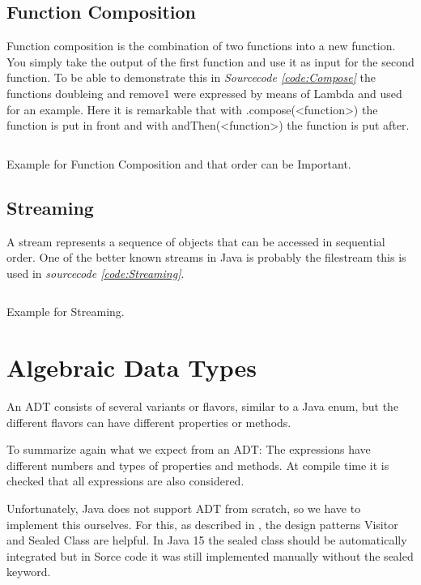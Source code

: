 \documentclass[a4paper,12pt,twoside]{scrreprt}
\begin{document}
\subsection{Function Composition}
Function composition is the combination of two functions into a new function. You simply take the output of the first function and use it as input for the second function. To be able to demonstrate this in \emph{Sourcecode \ref{code:Compose}} the functions doubleing and remove1 were expressed by means of Lambda and used for an example. Here it is remarkable that with .compose(<function>) the function is put in front and with andThen(<function>) the function is put after.
\begin{listing}[ht]
    \inputminted[fontsize=\footnotesize,linenos]{java}{./code/FunctionComposition.java}
    \caption[Example for Function Composition]{Example for Function Composition and that order can be Important.}
    \label{code:Compose}
\end{listing}
\subsection{Streaming}
A stream represents a sequence of objects that can be accessed in sequential order.
One of the better known streams in Java is probably the filestream this is used in \emph{sourcecode \ref{code:Streaming}}.
\begin{listing}[ht]
    \inputminted[fontsize=\footnotesize,linenos]{java}{./code/Streaming.java}
    \caption[Example for Streaming]{Example for Streaming.}
    \label{code:Streaming}
\end{listing}
\section{Algebraic Data Types}
An \ac{ADT} consists of several variants or flavors, similar to a Java enum, but the different flavors can have different properties or methods.

To summarize again what we expect from an \ac{ADT}:
The expressions have different numbers and types of properties and methods.
At compile time it is checked that all expressions are also considered.

Unfortunately, Java does not support ADT from scratch, so we have to implement this ourselves. For this, as described in \cite{MAINIERO_algebraic_2020}, the design patterns Visitor and Sealed Class are helpful. In Java 15 the sealed class should be automatically integrated but in Sorce code it was still implemented manually without the sealed keyword.
\end{document}
